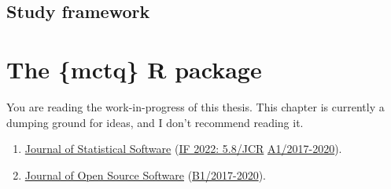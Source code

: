\documentclass[
  12pt,
  a4paper,
  oneside]{tesesusp}
\providecommand{\tightlist}{%
  \setlength{\itemsep}{0pt}\setlength{\parskip}{0pt}}\usepackage{longtable,booktabs,array}
\begin{document}
\vspace{10pt}

\hypertarget{study-framework}{%
\section{Study framework}\label{study-framework}}

\hypertarget{the-mctq-r-package}{%
\chapter{The \{mctq\} R package}\label{the-mctq-r-package}}

\begin{tcolorbox}[enhanced jigsaw, breakable, colback=white, colbacktitle=quarto-callout-important-color!10!white, leftrule=.75mm, left=2mm, toprule=.15mm, opacityback=0, rightrule=.15mm, title=\textcolor{quarto-callout-important-color}{\faExclamation}\hspace{0.5em}{Important}, opacitybacktitle=0.6, bottomtitle=1mm, titlerule=0mm, toptitle=1mm, coltitle=black, colframe=quarto-callout-important-color-frame, bottomrule=.15mm, arc=.35mm]

You are reading the work-in-progress of this thesis. This chapter is
currently a dumping ground for ideas, and I don't recommend reading it.

\end{tcolorbox}

\begin{tcolorbox}[enhanced jigsaw, breakable, colback=white, colbacktitle=quarto-callout-note-color!10!white, leftrule=.75mm, left=2mm, toprule=.15mm, opacityback=0, rightrule=.15mm, title=\textcolor{quarto-callout-note-color}{\faInfo}\hspace{0.5em}{Target}, opacitybacktitle=0.6, bottomtitle=1mm, titlerule=0mm, toptitle=1mm, coltitle=black, colframe=quarto-callout-note-color-frame, bottomrule=.15mm, arc=.35mm]

\begin{enumerate}
\def\labelenumi{\arabic{enumi}.}
\tightlist
\item
  \href{https://www.jstatsoft.org/authors}{Journal of Statistical
  Software} (\href{https://jcr.clarivate.com/jcr/}{IF 2022: 5.8/JCR}
  \textbar{}
  \href{https://sucupira.capes.gov.br/sucupira/public/consultas/coleta/veiculoPublicacaoQualis/listaConsultaGeralPeriodicos.jsf}{A1/2017-2020}).
\item
  \href{https://joss.readthedocs.io/en/latest/submitting.html}{Journal
  of Open Source Software}
  (\href{https://sucupira.capes.gov.br/sucupira/public/consultas/coleta/veiculoPublicacaoQualis/listaConsultaGeralPeriodicos.jsf}{B1/2017-2020}).
\end{enumerate}

\end{tcolorbox}
\end{document}

